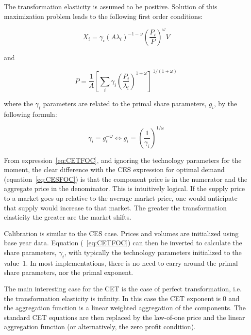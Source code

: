 The transformation elasticity is assumed to be positive. Solution of this maximization problem leads
to the following first order conditions:

\begin{equation}
\label{eq:CETFOC}
{{X}_{i}}={{\gamma }_{i}}{{\left( A{{\lambda }_{i}}
\right)}^{-1-\omega }}{{\left( \frac{{{P}_{i}}}{P}
\right)}^{\omega }}V
\end{equation}

\noindent and

\begin{equation}
\label{eq:CETDual}
P=\frac{1}{A}{{\left[ \sum\limits_{i}{{{\gamma }_{i}}{{\left( \frac{{{P}_{i}}}{{{\lambda }_{i}}}
\right)}^{1+\omega }}} \right]}^{\ 1/\left( 1+\omega  \right)}}
\end{equation}

\noindent where the $\gamma_i$ parameters are related to the primal share parameters, $g_i$, by the
following formula:

\begin{displaymath}
{{\gamma }_{i}}=g_{i}^{-\omega }\Leftrightarrow {{g}_{i}}={{\left( \frac{1}{{{\gamma }_{i}}}
\right)}^{1/\omega }}
\end{displaymath}

From expression~\ref{eq:CETFOC}, and ignoring the technology parameters for the moment,
the clear difference with the CES expression for optimal demand (equation~\ref{eq:CESFOC}) is
that the component price is in the numerator and the aggregate price in the denominator. This is
intuitively logical. If the supply price to a market goes up relative to the average market price,
one would anticipate that supply would increase to that market. The greater the transformation
elasticity the greater are the market shifts.

Calibration is similar to the CES case. Prices and volumes are initialized using base year data.
Equation (~\ref{eq:CETFOC}) can then be inverted to calculate the share parameters, $\gamma_i$,
with typically the technology parameters initialized to the value~1. In most implementations, there
is no need to carry around the primal share parameters, nor the primal exponent.

The main interesting case for the CET is the case of perfect transformation, i.e. the transformation
elasticity is infinity. In this case the CET exponent is 0 and the aggregation function is a linear
weighted aggregation of the components. The standard CET equations are then replaced by the
law-of-one price and the linear aggregation function (or alternatively, the zero profit condition).

